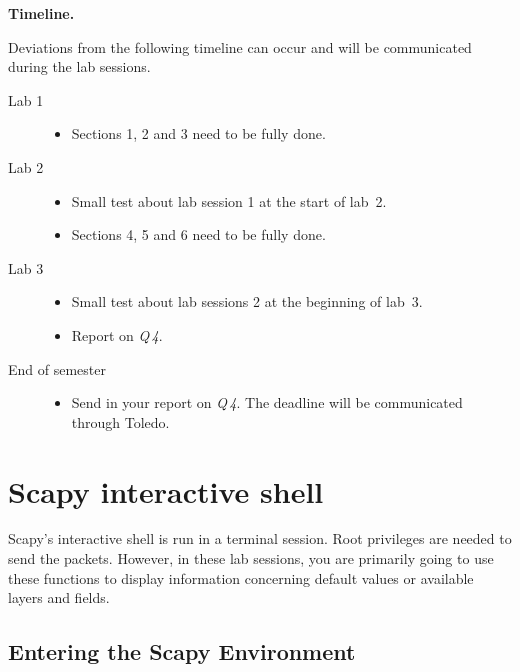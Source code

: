 \documentclass[11pt,a4paper]{article}
\begin{document}
\textbf{Timeline.}

Deviations from the following timeline can occur and will be communicated during the lab sessions. 

\begin{description}
    \item[Lab 1]\hfill
    \begin{itemize}
        \item Sections 1, 2 and 3 need to be fully done.
    \end{itemize}
    \item[Lab 2]\hfill
    \begin{itemize}
        \item Small test about lab session 1 at the start of lab~2.
        \item Sections 4, 5 and 6 need to be fully done.
       
    \end{itemize}
    \item[Lab 3]\hfill
     \begin{itemize}
        \item Small test about lab sessions 2 at the beginning of lab~3.
        \item  Report on \textit{Q\,4}.
     \end{itemize}
     \item[End of semester]\hfill
     \begin{itemize}
        \item Send in your report on \textit{Q\,4}. The deadline will be communicated through Toledo.
     \end{itemize}
\end{description}

\clearpage
\appendix
\section{Scapy interactive shell}\label{sec:scapy-interactive}

Scapy's interactive shell is run in a terminal session. Root privileges are needed to send the packets. However, in these lab sessions, you are primarily going to use these functions to display information concerning default values or available layers and fields.

\subsection{Entering the Scapy Environment}
\end{document}

